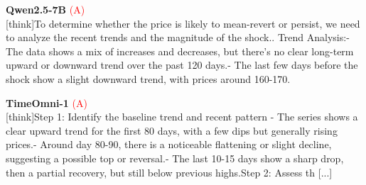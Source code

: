 \noindent
\begin{minipage}[t]{0.28\textwidth}
\colorbox{red!8}{\parbox{\dimexpr\textwidth-2\fboxsep}{
\textbf{Qwen2.5-7B} \textcolor{red}{(A)} \\[2pt]
\tiny
[think]\newline To determine whether the price is likely to mean-revert or persist, we need to analyze the recent trends and the magnitude of the shock.. Trend Analysis:\newline    - The data shows a mix of increases and decreases, but there's no clear long-term upward or downward trend over the past 120 days.\newline    - The last few days before the shock show a slight downward trend, with prices around 160-170.\newline  [...]
}}
\end{minipage}
\hfill
\begin{minipage}[t]{0.28\textwidth}
\colorbox{red!8}{\parbox{\dimexpr\textwidth-2\fboxsep}{
\textbf{TimeOmni-1} \textcolor{red}{(A)} \\[2pt]
\tiny
[think]\newline Step 1: Identify the baseline trend and recent pattern  \newline - The series shows a clear upward trend for the first  80 days, with a few dips but generally rising prices.\newline - Around day 80-90, there is a noticeable flattening or slight decline, suggesting a possible top or reversal.\newline - The last 10-15 days show a sharp drop, then a partial recovery, but still below previous highs.\newline Step 2: Assess th [...]
}}
\end{minipage}
\hfill
